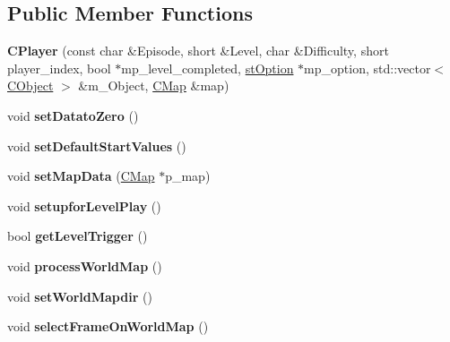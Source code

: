 \subsection*{Public Member Functions}
\begin{DoxyCompactItemize}
\item 
\hypertarget{class_c_player_a46a05e9b944769472304057354098c70}{
{\bfseries CPlayer} (const char \&Episode, short \&Level, char \&Difficulty, short player\_\-index, bool $\ast$mp\_\-level\_\-completed, \hyperlink{structst_option}{stOption} $\ast$mp\_\-option, std::vector$<$ \hyperlink{class_c_object}{CObject} $>$ \&m\_\-Object, \hyperlink{class_c_map}{CMap} \&map)}
\label{class_c_player_a46a05e9b944769472304057354098c70}

\item 
\hypertarget{class_c_player_a24cfbde1f3794d23ecb479e2d2debde8}{
void {\bfseries setDatatoZero} ()}
\label{class_c_player_a24cfbde1f3794d23ecb479e2d2debde8}

\item 
\hypertarget{class_c_player_a52e4c23f66ddd08974361bcb559d72c9}{
void {\bfseries setDefaultStartValues} ()}
\label{class_c_player_a52e4c23f66ddd08974361bcb559d72c9}

\item 
\hypertarget{class_c_player_af0c8cb4f012bdb62095655e2376c726a}{
void {\bfseries setMapData} (\hyperlink{class_c_map}{CMap} $\ast$p\_\-map)}
\label{class_c_player_af0c8cb4f012bdb62095655e2376c726a}

\item 
\hypertarget{class_c_player_aca8a838f6fbb08a86bddbe5b62ad5ffc}{
void {\bfseries setupforLevelPlay} ()}
\label{class_c_player_aca8a838f6fbb08a86bddbe5b62ad5ffc}

\item 
\hypertarget{class_c_player_a2e93978c93f52fa9be3017b909c2bd4b}{
bool {\bfseries getLevelTrigger} ()}
\label{class_c_player_a2e93978c93f52fa9be3017b909c2bd4b}

\item 
\hypertarget{class_c_player_a535d99ebf53a925526c1cf42c3407cde}{
void {\bfseries processWorldMap} ()}
\label{class_c_player_a535d99ebf53a925526c1cf42c3407cde}

\item 
\hypertarget{class_c_player_a345db97e55058f9ecdb356e31d71c889}{
void {\bfseries setWorldMapdir} ()}
\label{class_c_player_a345db97e55058f9ecdb356e31d71c889}

\item 
\hypertarget{class_c_player_a1a1de7b27fef066e05c375e901b67f91}{
void {\bfseries selectFrameOnWorldMap} ()}
\label{class_c_player_a1a1de7b27fef066e05c375e901b67f91}


\end{DoxyCompactItemize}
